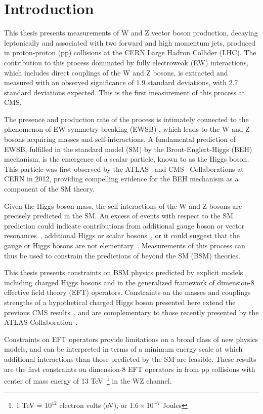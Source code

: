 \chapter{Introduction}

This thesis presents measurements of W and Z vector boson production, 
decaying leptonically and associated
with two forward and high momentum jets, produced in proton-proton (pp) collisions
at the CERN Large Hadron Collider (LHC). 
The contribution to this process dominated by fully electroweak (EW)
interactions, which includes direct couplings of the W and Z bosons, 
is extracted and measured with an observed significance of
1.9 standard deviations, with 2.7 standard deviations expected. 
This is the first measurement of this process at CMS. 

The presence and production rate of the \EWWZ process is intimately connected to the 
phenomenon of EW symmetry breaking (EWSB) \cite{Quigg:2009vq}, which leads to 
the W and Z bosons acquiring masses
and self-interactions. A fundamental prediction
of EWSB, fulfilled in the standard model (SM) by the Brout-Englert-Higgs (BEH) mechanism,
is the emergence of a scalar particle, known 
to as the Higgs boson. 
This particle was first observed by the 
ATLAS~\cite{Aad:2012tfa} and CMS~\cite{Chatrchyan:2012xdj,Chatrchyan:2013lba} Collaborations
at CERN in 2012, providing compelling evidence for the BEH mechanism as
a component of the SM theory.

Given the Higgs boson mass, the self-interactions 
of the W and Z bosons are precisely predicted in the SM. 
An excess of \EWWZ events with respect to the SM prediction could indicate contributions from 
additional gauge boson or vector resonances~\cite{Delgado:2017cls}, 
additional Higgs or scalar bosons~\cite{Kilian:2015opv}, 
or it could suggest that the gauge or Higgs bosons are not elementary~\cite{Csaki:2015hcd}.
Measurements of this process can thus be used to constrain the predictions
of beyond the SM (BSM) theories. 

This thesis presents constraints on BSM physics predicted by explicit models
including charged Higgs bosons 
and in the generalized framework of dimension-8 effective field theory (EFT) operators.
Constraints on the masses and couplings strengths of a hypothetical
charged Higgs boson presented here extend the previous CMS results~\cite{Sirunyan:2017sbn}, and
are complementary to those recently presented by the ATLAS Collaboration~\cite{Aaboud:2018ohp}. 

Constraints on EFT operators provide limitations on a broad class of new physics
models, and can be interpreted in terms of a minimum energy scale at which additional
interactions than those predicted by the SM are feasible.
These results are the first constraints on dimension-8 EFT operators 
in from pp collisions with center of mass energy of 
13 TeV~\footnote{1 TeV = $10^{12}$ electron volts (eV), or $1.6\times10^{-7}$ Joules} in the WZ channel.

